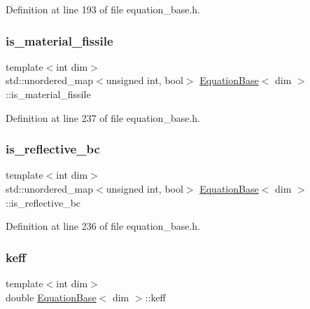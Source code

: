 Definition at line 193 of file equation\+\_\+base.\+h.

\mbox{\label{class_equation_base_a2568ffad6a52d3bf3227eea51a314cb4}} 
\subsubsection{\texorpdfstring{is\+\_\+material\+\_\+fissile}{is\_material\_fissile}}
{\footnotesize\ttfamily template$<$int dim$>$ \\
std\+::unordered\+\_\+map$<$unsigned int, bool$>$ \hyperlink{class_equation_base}{Equation\+Base}$<$ dim $>$\+::is\+\_\+material\+\_\+fissile\hspace{0.3cm}{\ttfamily [protected]}}



Definition at line 237 of file equation\+\_\+base.\+h.

\mbox{\label{class_equation_base_a91757532b2fd3759a976b22a83a9f8d8}} 
\subsubsection{\texorpdfstring{is\+\_\+reflective\+\_\+bc}{is\_reflective\_bc}}
{\footnotesize\ttfamily template$<$int dim$>$ \\
std\+::unordered\+\_\+map$<$unsigned int, bool$>$ \hyperlink{class_equation_base}{Equation\+Base}$<$ dim $>$\+::is\+\_\+reflective\+\_\+bc\hspace{0.3cm}{\ttfamily [protected]}}



Definition at line 236 of file equation\+\_\+base.\+h.

\mbox{\label{class_equation_base_ab3cf94dc329f486555f89bdb0dd94ed6}} 
\subsubsection{\texorpdfstring{keff}{keff}}
{\footnotesize\ttfamily template$<$int dim$>$ \\
double \hyperlink{class_equation_base}{Equation\+Base}$<$ dim $>$\+::keff\hspace{0.3cm}{\ttfamily [protected]}}



